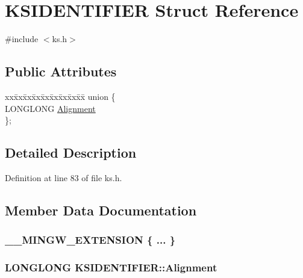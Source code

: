 \hypertarget{struct_k_s_i_d_e_n_t_i_f_i_e_r}{}\section{K\+S\+I\+D\+E\+N\+T\+I\+F\+I\+ER Struct Reference}
\label{struct_k_s_i_d_e_n_t_i_f_i_e_r}


{\ttfamily \#include $<$ks.\+h$>$}

\subsection*{Public Attributes}
\begin{DoxyCompactItemize}
\item 
\begin{tabbing}
xx\=xx\=xx\=xx\=xx\=xx\=xx\=xx\=xx\=\kill
union \{\\
\>LONGLONG \hyperlink{struct_k_s_i_d_e_n_t_i_f_i_e_r_a4258fddf06c93e240214c167708e21f0}{Alignment}\\
\}; \\

\end{tabbing}\end{DoxyCompactItemize}


\subsection{Detailed Description}


Definition at line 83 of file ks.\+h.



\subsection{Member Data Documentation}
\subsubsection[{\texorpdfstring{"@174}{@174}}]{\setlength{\rightskip}{0pt plus 5cm}\+\_\+\+\_\+\+M\+I\+N\+G\+W\+\_\+\+E\+X\+T\+E\+N\+S\+I\+ON \{ ... \} }\hypertarget{struct_k_s_i_d_e_n_t_i_f_i_e_r_a8889150db304df48ed9d4285c1aecaa0}{}\label{struct_k_s_i_d_e_n_t_i_f_i_e_r_a8889150db304df48ed9d4285c1aecaa0}
\subsubsection[{\texorpdfstring{Alignment}{Alignment}}]{\setlength{\rightskip}{0pt plus 5cm}L\+O\+N\+G\+L\+O\+NG K\+S\+I\+D\+E\+N\+T\+I\+F\+I\+E\+R\+::\+Alignment}\hypertarget{struct_k_s_i_d_e_n_t_i_f_i_e_r_a4258fddf06c93e240214c167708e21f0}{}\label{struct_k_s_i_d_e_n_t_i_f_i_e_r_a4258fddf06c93e240214c167708e21f0}


